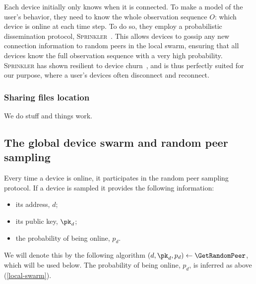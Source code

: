 Each device initially only knows when it is connected. 
To make a model of the user's behavior, they need to know the whole observation sequence $O$: which device is online at each time step.
To do so, they employ a probabilistic dissemination protocol, 
\textsc{Sprinkler}~\cite{luxey:hal-01704172}.
This allows devices to gossip any new connection information to random peers in 
the local swarm, ensuring that all devices know the full observation sequence 
with a very high probability.
\textsc{Sprinkler} has shown resilient to device churn~\cite{luxey:cascade}, and 
is thus perfectly suited for our purpose, where a user's devices often 
disconnect and reconnect. 




\subsubsection{Sharing files location}%
\label{ssub:sharing_files_location}

We do stuff and things work.



\subsection{The global device swarm and random peer sampling}




Every time a device is online, it participates in the random peer sampling 
protocol.
If a device is sampled it provides the following information:
\begin{itemize}
  \item its address, \(d\);
  \item its public key, \(\pk_d\);
  \item the probability of being online, \(p_d\).
\end{itemize}
We will denote this by the following algorithm \((d, \pk_d, p_d)\gets 
  \GetRandomPeer\), which will be used below.
The probability of being online, \(p_d\), is inferred as above 
(\cref{local-swarm}).


